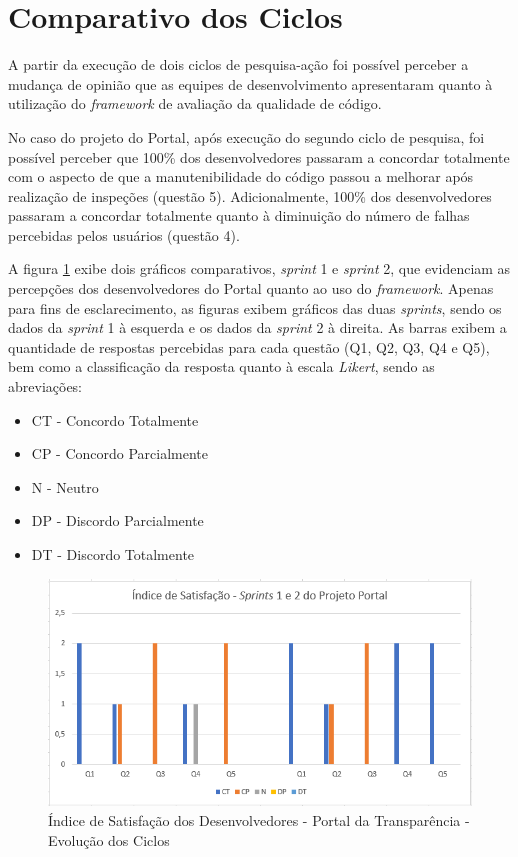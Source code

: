 \clearpage

\section{Comparativo dos Ciclos}

A partir da execução de dois ciclos de pesquisa-ação foi possível perceber a mudança de opinião que as equipes de desenvolvimento apresentaram quanto à utilização do \textit{framework} de avaliação da qualidade de código.

No caso do projeto do Portal, após execução do segundo ciclo de pesquisa, foi possível perceber que 100\% dos desenvolvedores passaram a concordar totalmente com o aspecto de que a manutenibilidade do código passou a melhorar após realização de inspeções (questão 5). Adicionalmente, 100\% dos desenvolvedores passaram a concordar totalmente quanto à diminuição do número de falhas percebidas pelos usuários (questão 4).

A figura \ref{fig:evolucaoPortal} exibe dois gráficos comparativos, \textit{sprint} 1 e \textit{sprint} 2, que evidenciam as percepções dos desenvolvedores do Portal quanto ao uso do \textit{framework}. Apenas para fins de esclarecimento, as figuras exibem gráficos das duas \textit{sprints}, sendo os dados da \textit{sprint} 1 à esquerda e os dados da \textit{sprint} 2 à direita. As barras exibem a quantidade de respostas percebidas para cada questão (Q1, Q2, Q3, Q4 e Q5), bem como a classificação da resposta quanto à escala \textit{Likert}, sendo as abreviações:

\begin{itemize}
	\item CT - Concordo Totalmente
	\item CP - Concordo Parcialmente
	\item N - Neutro
	\item DP - Discordo Parcialmente
	\item DT - Discordo Totalmente
\end{itemize}

\begin{figure}[h]
\includegraphics[width=\textwidth]{figuras/isd_portal.png}
\caption{Índice de Satisfação dos Desenvolvedores - Portal da Transparência - Evolução dos Ciclos}
\label{fig:evolucaoPortal}
\end{figure}

